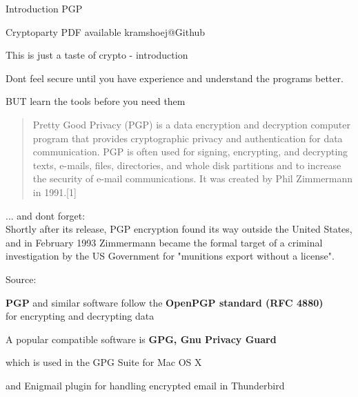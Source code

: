 \documentclass[20pt,landscape,a4paper,footrule]{foils}
\begin{document}


\mytitlepage
{Introduction PGP}

\centerline{\footnotesize Cryptoparty
 PDF available kramshoej@Github}

\LogoOn

%



\begin{center}
This is just a taste of crypto - introduction

Dont feel secure until you have experience and understand the programs better.

BUT learn the tools before you need them
\end{center}



\begin{quote}
Pretty Good Privacy (PGP) is a data encryption and decryption computer program that provides cryptographic privacy and authentication for data communication. PGP is often used for signing, encrypting, and decrypting texts, e-mails, files, directories, and whole disk partitions and to increase the security of e-mail communications. It was created by Phil Zimmermann in 1991.[1]
\end{quote}


... and dont forget:\\
Shortly after its release, PGP encryption found its way outside the United States, and in February 1993 Zimmermann became the formal target of a criminal investigation by the US Government for "munitions export without a license".

Source: 



\begin{list1}
\item {\bf PGP} and similar software follow the {\bf OpenPGP standard (RFC 4880)}\\
for encrypting and decrypting data
\item A popular compatible software is {\bf GPG, Gnu Privacy Guard}\\
\item which is used in the GPG Suite for Mac OS X 
\item and Enigmail plugin for handling encrypted email in Thunderbird
\end{list1}
\end{document}
